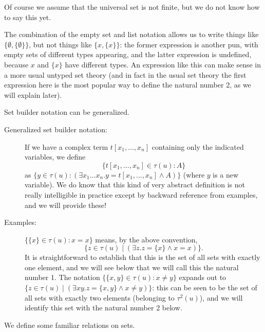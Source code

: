 \documentclass[12pt]{book}
\begin{document}
Of course we assume that the universal set is not finite, but we do
not know how to say this yet.

The combination of the empty set and list notation allows us to write
things like $\{\emptyset,\{\emptyset\}\}$, but not things like
$\{x,\{x\}\}$: the former expression is another pun, with empty sets
of different types appearing, and the latter expression is
undefined, because $x$ and $\{x\}$ have different types.  An expression like this can make sense in a more usual
untyped set theory (and in fact in the usual set theory the first
expression here is the most popular way to define the natural number 2, as we
will explain later).

Set builder notation can be generalized.  

\begin{description}

\item[Generalized set builder notation:] If we have a complex term
$t[x_1,\ldots,x_n]$ containing only the indicated variables, we define
$$\{t[x_1,\ldots,x_n] \in \tau(u):  A\}$$ as $\{y \in \tau(u):  (\exists x_1\ldots
x_n.y=t[x_1,\ldots,x_n] \wedge A)\}$ (where $y$ is a new variable).
We do know that this kind of very abstract definition is not really
intelligible in practice except by backward reference from examples,
and we will provide these!

\item[Examples:] $\{\{x\}\in \tau(u):x=x\}$ means, by the above convention,
$$\{z\in \tau(u) \mid (\exists z.z=\{x\}\wedge x=x)\}.$$  It is straightforward to
establish that this is the set of all sets with exactly one element,
and we will see below that we will call this the natural number 1.
The notation $\{\{x,y\}\in \tau(u): x \neq y\}$ expands out to $\{z\in \tau(u) \mid
(\exists xy.z = \{x,y\} \wedge x\neq y)\}$: this can be seen to be the
set of all sets with exactly two elements (belonging to $\tau^2(u)$), and we will identify this
set with the natural number 2 below.

\end{description}


We define some familiar relations on sets.
\end{document}
